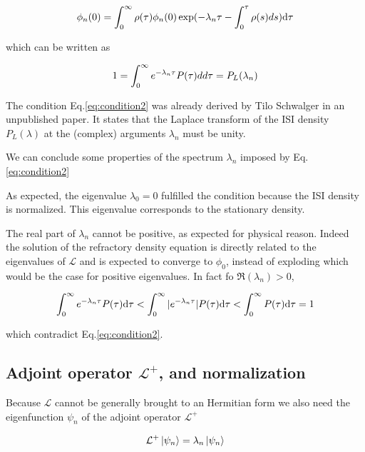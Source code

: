 \documentclass[a4paper,11pt,twoside]{article}
\def \dd  {{\rm d}}
\numberwithin{equation}{section}
\begin{document}
\begin{equation}
\label{eq:condition1}
\phi_n(0)=\int_0^\infty\rho(\tau)\phi_n(0)\exp(-\lambda_n\tau-\int_0^\tau\rho(s)ds)\dd\tau
\end{equation}

which can be written as

\begin{equation}
\label{eq:condition2}
1=\int_0^\infty e^{-\lambda_n \tau}P(\tau)dd\tau=P_L(\lambda_n)\\
\end{equation}

The condition Eq.\eqref{eq:condition2} was already derived by Tilo Schwalger in an unpublished paper. It states that the Laplace transform of the ISI density $P_L(\lambda)$ at the (complex) arguments $\lambda_{n}$ must be unity. 

We can conclude some properties of the spectrum {$\lambda_n$} imposed by Eq.\eqref{eq:condition2}

As expected, the eigenvalue $\lambda_0=0$ fulfilled the condition because the ISI density is normalized. This eigenvalue corresponds to the stationary density.

The real part of $\lambda_n$ cannot be positive, as expected for physical reason. Indeed the solution of the refractory density equation is directly related to the eigenvalues of $\mathcal{L}$ and is expected to converge to $\phi_0$, instead of exploding which would be the case for positive eigenvalues. In fact fo $\Re(\lambda_n)>0$,

\begin{equation}
\int_0^\infty e^{-\lambda_n \tau} P(\tau) \dd\tau<\int_0^\infty |e^{-\lambda_n\tau} |P(\tau) \dd\tau<\int_0^\infty P(\tau) \dd\tau=1
\end{equation}

which contradict Eq.\eqref{eq:condition2}.



\subsection{Adjoint operator $\mathcal{L}^+$, and normalization}

Because $\mathcal{L}$ cannot be generally brought to an Hermitian form we also need  the eigenfunction $\psi_n$ of the adjoint operator  $\mathcal{L}^{+}$

\begin{equation}
\label{eq:Ldegaoperator}
\mathcal{L}^+\ket{\psi_n}=\lambda_n\ket{\psi_n}
\end{equation}
\end{document}
